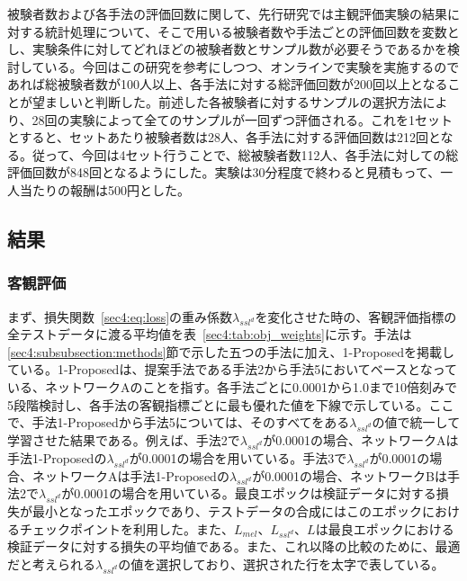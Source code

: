\documentclass[12pt]{jarticle}
\numberwithin{equation}{section}    %
\numberwithin{figure}{section}      %
\numberwithin{table}{section}      %
\begin{document}
被験者数および各手法の評価回数に関して、先行研究\cite{wester2015we}では主観評価実験の結果に対する統計処理について、そこで用いる被験者数や手法ごとの評価回数を変数とし、実験条件に対してどれほどの被験者数とサンプル数が必要そうであるかを検討している。今回はこの研究を参考にしつつ、オンラインで実験を実施するのであれば総被験者数が100人以上、各手法に対する総評価回数が200回以上となることが望ましいと判断した。前述した各被験者に対するサンプルの選択方法により、28回の実験によって全てのサンプルが一回ずつ評価される。これを1セットとすると、セットあたり被験者数は28人、各手法に対する評価回数は212回となる。従って、今回は4セット行うことで、総被験者数112人、各手法に対しての総評価回数が848回となるようにした。実験は30分程度で終わると見積もって、一人当たりの報酬は500円とした。

\subsection{結果}
\subsubsection{客観評価}
まず、損失関数~\eqref{sec4:eq:loss}の重み係数$\lambda_{ssl^{d}}$を変化させた時の、客観評価指標の全テストデータに渡る平均値を表~\ref{sec4:tab:obj_weights}に示す。手法は\ref{sec4:subsubsection:methods}節で示した五つの手法に加え、1-Proposedを掲載している。1-Proposedは、提案手法である手法2から手法5においてベースとなっている、ネットワークAのことを指す。各手法ごとに0.0001から1.0まで10倍刻みで5段階検討し、各手法の客観指標ごとに最も優れた値を下線で示している。ここで、手法1-Proposedから手法5については、そのすべてをある$\lambda_{ssl^{d}}$の値で統一して学習させた結果である。例えば、手法2で$\lambda_{ssl^{d}}$が0.0001の場合、ネットワークAは手法1-Proposedの$\lambda_{ssl^{d}}$が0.0001の場合を用いている。手法3で$\lambda_{ssl^{d}}$が0.0001の場合、ネットワークAは手法1-Proposedの$\lambda_{ssl^{d}}$が0.0001の場合、ネットワークBは手法2で$\lambda_{ssl^{d}}$が0.0001の場合を用いている。最良エポックは検証データに対する損失が最小となったエポックであり、テストデータの合成にはこのエポックにおけるチェックポイントを利用した。また、$L_{mel}$、$L_{ssl^{d}}$、$L$は最良エポックにおける検証データに対する損失の平均値である。また、これ以降の比較のために、最適だと考えられる$\lambda_{ssl^{d}}$の値を選択しており、選択された行を太字で表している。
\end{document}
